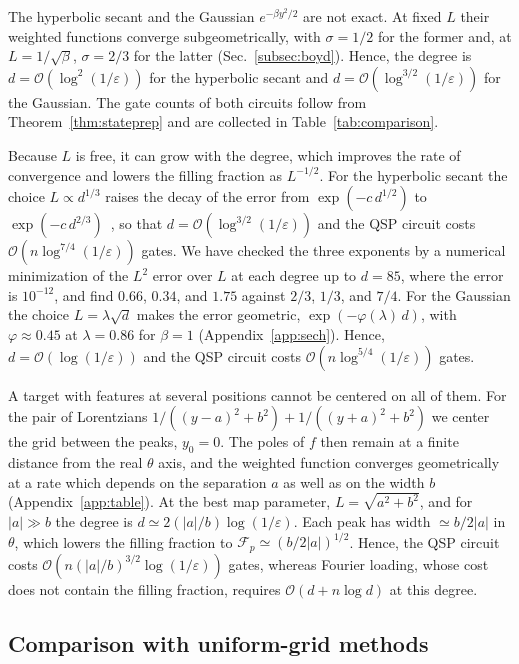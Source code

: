 The hyperbolic secant and the Gaussian $e^{-\beta y^2/2}$ are not
exact.  At fixed $L$ their weighted functions converge
subgeometrically, with $\sigma=1/2$ for the former and, at
$L=1/\sqrt{\beta}$, $\sigma=2/3$ for the latter
(Sec.~\ref{subsec:boyd}).  Hence, the degree is
$d=\mathcal{O}(\log^2(1/\varepsilon))$ for the hyperbolic secant
and $d=\mathcal{O}(\log^{3/2}(1/\varepsilon))$ for the Gaussian.
The gate counts of both circuits follow from
Theorem~\ref{thm:stateprep} and are collected in
Table~\ref{tab:comparison}.

Because $L$ is free, it can grow with the degree, which improves
the rate of convergence and lowers the filling fraction as
$L^{-1/2}$.  For the hyperbolic secant the choice
$L\propto d^{1/3}$ raises the decay of the error from
$\exp(-c\,d^{1/2})$ to
$\exp(-c\,d^{2/3})$~\cite[Sec.~17.9]{Boyd2001}, so that
$d=\mathcal{O}(\log^{3/2}(1/\varepsilon))$ and the QSP circuit
costs
$\mathcal{O}(n\log^{7/4}(1/\varepsilon))$ gates.  We have checked
the three exponents by a numerical minimization of the $L^2$ error
over $L$ at each degree up to $d=85$, where the error is
$10^{-12}$, and find $0.66$, $0.34$, and $1.75$ against $2/3$,
$1/3$, and $7/4$.  For the
Gaussian the choice $L=\lambda\sqrt{d}$ makes the error geometric,
$\exp(-\varphi(\lambda)\,d)$, with $\varphi\approx0.45$ at
$\lambda=0.86$ for $\beta=1$ (Appendix~\ref{app:sech}).  Hence,
$d=\mathcal{O}(\log(1/\varepsilon))$ and the QSP circuit costs
$\mathcal{O}(n\log^{5/4}(1/\varepsilon))$ gates.

A target with features at several positions cannot be centered on
all of them.  For the pair of Lorentzians
$1/((y-a)^2+b^2)+1/((y+a)^2+b^2)$ we center the grid between the
peaks, $y_0=0$.  The poles of $f$ then remain at a finite distance
from the real $\theta$ axis, and the weighted function converges
geometrically at a rate which depends on the separation $a$ as
well as on the width $b$ (Appendix~\ref{app:table}).  At the best
map parameter, $L=\sqrt{a^2+b^2}$, and for $|a|\gg b$ the degree
is $d\simeq 2(|a|/b)\log(1/\varepsilon)$.  Each peak has width
$\simeq b/2|a|$ in $\theta$, which lowers the filling fraction to
$\mathcal{F}_p\simeq(b/2|a|)^{1/2}$.  Hence, the QSP circuit costs
$\mathcal{O}(n(|a|/b)^{3/2}\log(1/\varepsilon))$ gates, whereas
Fourier loading, whose cost does not contain the filling fraction,
requires
$\mathcal{O}(d+n\log d)$ at this degree.

\subsection{Comparison with uniform-grid methods}
\label{subsec:comparison}


